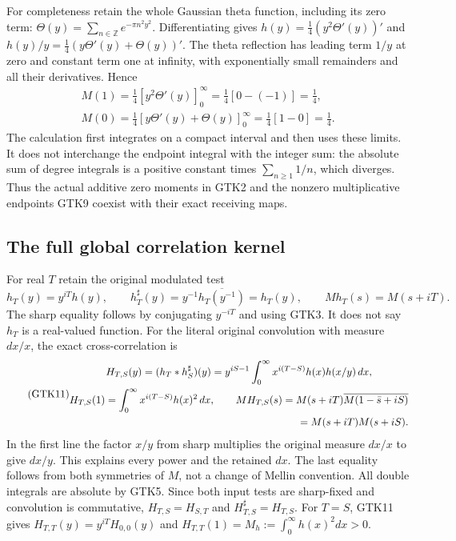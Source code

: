 For completeness retain the whole Gaussian theta function,
including its zero term:
$\Theta(y)=\sum_{n\in\mathbb Z}e^{-\pi n^2y^2}$.
Differentiating gives
$h(y)=\frac14(y^2\Theta'(y))'$ and
$h(y)/y=\frac14(y\Theta'(y)+\Theta(y))'$.
The theta reflection has leading term $1/y$ at zero and
constant term one at infinity, with exponentially small
remainders and all their derivatives. Hence
\begin{equation}\tag{GTK9}
 \begin{gathered}
 M(1)=\tfrac14[y^2\Theta'(y)]_0^\infty
        =\tfrac14[0-(-1)]=\tfrac14,\\
 M(0)=\tfrac14[y\Theta'(y)+\Theta(y)]_0^\infty
        =\tfrac14[1-0]=\tfrac14 .
 \end{gathered}
\end{equation}
The calculation first integrates on a compact interval and
then uses these limits. It does not interchange the endpoint
integral with the integer sum: the absolute sum of degree
integrals is a positive constant times $\sum_{n\ge1}1/n$,
which diverges. Thus the actual additive zero moments in
GTK2 and the nonzero multiplicative endpoints GTK9 coexist
with their exact receiving maps.

\subsection{The full global correlation kernel}

For real $T$ retain the original modulated test
\begin{equation}\tag{GTK10}
 h_T(y)=y^{iT}h(y),\qquad
 h_T^\sharp(y)=y^{-1}\overline{h_T(y^{-1})}=h_T(y),\qquad
 Mh_T(s)=M(s+iT).
\end{equation}
The sharp equality follows by conjugating $y^{-iT}$ and
using GTK3. It does not say $h_T$ is a real-valued function.
For the literal original convolution with measure $dx/x$,
the exact cross-correlation is
\begin{equation}\tag{GTK11}
 \begin{gathered}
 H_{T,S}(y)=(h_T*h_S^\sharp)(y)
   =y^{iS-1}\int_0^\infty
              x^{i(T-S)}h(x)h(x/y)\,dx,\\
 H_{T,S}(1)=\int_0^\infty
              x^{i(T-S)}h(x)^2\,dx,\qquad
 MH_{T,S}(s)=M(s+iT)\overline{M(1-\bar s+iS)}\\
 \hfill =M(s+iT)M(s+iS).
 \end{gathered}
\end{equation}
In the first line the factor $x/y$ from sharp multiplies the
original measure $dx/x$ to give $dx/y$. This explains every
power and the retained $dx$. The last equality follows from
both symmetries of $M$, not a change of Mellin convention.
All double integrals are absolute by GTK5. Since both input
tests are sharp-fixed and convolution is commutative,
$H_{T,S}=H_{S,T}$ and $H_{T,S}^\sharp=H_{T,S}$.
For $T=S$, GTK11 gives
$H_{T,T}(y)=y^{iT}H_{0,0}(y)$ and
$H_{T,T}(1)=M_h:=\int_0^\infty h(x)^2dx>0$.

